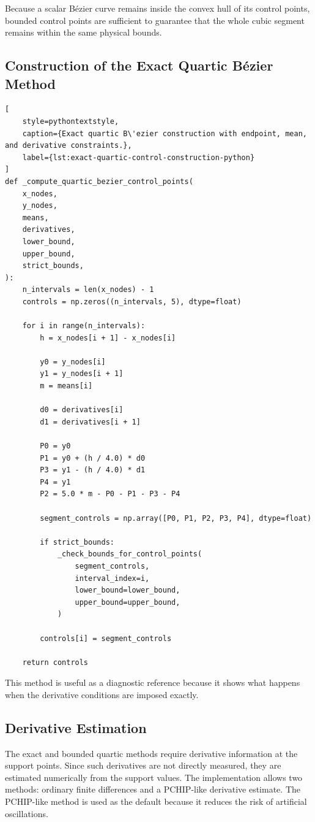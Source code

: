 \documentclass[12pt,a4paper]{article}
\begin{document}
Because a scalar B\'ezier curve remains inside the convex hull of its control
points, bounded control points are sufficient to guarantee that the whole
cubic segment remains within the same physical bounds.

\subsection{Construction of the Exact Quartic B\'ezier Method}

\begin{lstlisting}[
    style=pythontextstyle,
    caption={Exact quartic B\'ezier construction with endpoint, mean, and derivative constraints.},
    label={lst:exact-quartic-control-construction-python}
]
def _compute_quartic_bezier_control_points(
    x_nodes,
    y_nodes,
    means,
    derivatives,
    lower_bound,
    upper_bound,
    strict_bounds,
):
    n_intervals = len(x_nodes) - 1
    controls = np.zeros((n_intervals, 5), dtype=float)

    for i in range(n_intervals):
        h = x_nodes[i + 1] - x_nodes[i]

        y0 = y_nodes[i]
        y1 = y_nodes[i + 1]
        m = means[i]

        d0 = derivatives[i]
        d1 = derivatives[i + 1]

        P0 = y0
        P1 = y0 + (h / 4.0) * d0
        P3 = y1 - (h / 4.0) * d1
        P4 = y1
        P2 = 5.0 * m - P0 - P1 - P3 - P4

        segment_controls = np.array([P0, P1, P2, P3, P4], dtype=float)

        if strict_bounds:
            _check_bounds_for_control_points(
                segment_controls,
                interval_index=i,
                lower_bound=lower_bound,
                upper_bound=upper_bound,
            )

        controls[i] = segment_controls

    return controls
\end{lstlisting}

This method is useful as a diagnostic reference because it shows what happens
when the derivative conditions are imposed exactly.

\subsection{Derivative Estimation}

The exact and bounded quartic methods require derivative information at the
support points. Since such derivatives are not directly measured, they are
estimated numerically from the support values. The implementation allows two
methods: ordinary finite differences and a PCHIP-like derivative estimate.
The PCHIP-like method is used as the default because it reduces the risk of
artificial oscillations.
\end{document}
